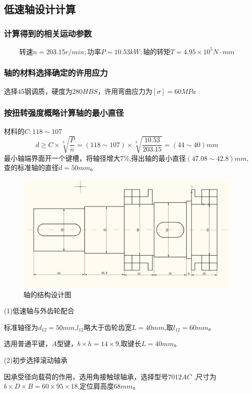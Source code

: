 \subsection{低速轴设计计算}
\subsubsection{计算得到的相关运动参数}
\[
        转速 n = 203.15r/min;功率 P =10.53kW;轴的转矩T=4.95\times 10^5 N\cdot mm
\]
\subsubsection{轴的材料选择确定的许用应力}
    选择$45$钢调质，硬度为$280HBS$，许用弯曲应力为$[\sigma]=60MPa$
\subsubsection{按扭转强度概略计算轴的最小直径}
材料的$C:118\sim 107$
    \[
        d \geq C\times \sqrt[3]{\frac{P}{n}}=(118\sim 107)\times \sqrt[3]{\frac{10.53}{203.15}}=(44\sim 40)mm
    \]
    最小轴端界面开一个键槽，将轴径增大$7\%$,得出轴的最小直径$(47.08\sim 42.8)mm$,查的标准轴的直径$d=50mm$。
\begin{figure}[h]
    \centering
    \includegraphics[scale=0.4]{graphic/5-3.png}
    \caption{轴的结构设计图}
\end{figure}

(1)低速轴与外齿轮配合

标准轴径为$d_{12}=50mm$,$l_{12}$略大于齿轮齿宽$L=40mm$,取$l_{12}=60mm$。

选用普通平键，$A$型键，$b\times h=14\times 9$,取键长$L=40mm$。

(2)初步选择滚动轴承

因承受径向载荷的作用，选用角接触球轴承，选择型号$7012AC$ ,尺寸为$b\times D \times B=60\times 95 \times 18$,定位肩高度$68mm$。


